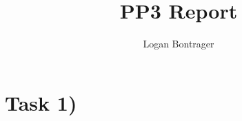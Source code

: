 \documentclass{article}
\begin{document}
\title{PP3 Report}
\author{Logan Bontrager}
\maketitle

\section*{Task 1)}
\end{document}

